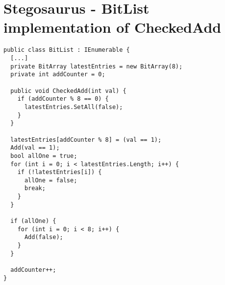 \chapter{Stegosaurus - BitList implementation of CheckedAdd}
\label{app:D}
\begin{lstlisting}
public class BitList : IEnumerable {
  [...]
  private BitArray latestEntries = new BitArray(8);
  private int addCounter = 0;

  public void CheckedAdd(int val) {
    if (addCounter % 8 == 0) {
      latestEntries.SetAll(false);
    }
  }
  
  latestEntries[addCounter % 8] = (val == 1);
  Add(val == 1);
  bool allOne = true;
  for (int i = 0; i < latestEntries.Length; i++) {
    if (!latestEntries[i]) {
      allOne = false;
      break;
    }
  }

  if (allOne) {
    for (int i = 0; i < 8; i++) {
      Add(false);
    }
  }

  addCounter++;
}
\end{lstlisting}